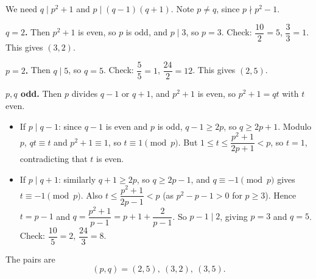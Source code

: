 We need \(q\mid p^2+1\) and \(p\mid (q-1)(q+1)\). Note \(p\ne q\), since \(p\nmid p^2-1\).

\textbf{\(q=2\).} Then \(p^2+1\) is even, so \(p\) is odd, and \(p\mid 3\), so \(p=3\). Check: \(\dfrac{10}{2}=5\), \(\dfrac{3}{3}=1\). This gives \((3,2)\).

\textbf{\(p=2\).} Then \(q\mid 5\), so \(q=5\). Check: \(\dfrac{5}{5}=1\), \(\dfrac{24}{2}=12\). This gives \((2,5)\).

\textbf{\(p,q\) odd.} Then \(p\) divides \(q-1\) or \(q+1\), and \(p^2+1\) is even, so \(p^2+1=qt\) with \(t\) even.
\begin{itemize}
\item If \(p\mid q-1\): since \(q-1\) is even and \(p\) is odd, \(q-1\ge 2p\), so \(q\ge 2p+1\). Modulo \(p\), \(qt\equiv t\) and \(p^2+1\equiv 1\), so \(t\equiv 1\pmod p\). But \(1\le t\le\dfrac{p^2+1}{2p+1}<p\), so \(t=1\), contradicting that \(t\) is even.
\item If \(p\mid q+1\): similarly \(q+1\ge 2p\), so \(q\ge 2p-1\), and \(q\equiv -1\pmod p\) gives \(t\equiv -1\pmod p\). Also \(t\le\dfrac{p^2+1}{2p-1}<p\) (as \(p^2-p-1>0\) for \(p\ge 3\)). Hence \(t=p-1\) and \(q=\dfrac{p^2+1}{p-1}=p+1+\dfrac{2}{p-1}\). So \(p-1\mid 2\), giving \(p=3\) and \(q=5\). Check: \(\dfrac{10}{5}=2\), \(\dfrac{24}{3}=8\).
\end{itemize}
The pairs are
\[
\boxed{(p,q)=(2,5),\ (3,2),\ (3,5)}.
\]
